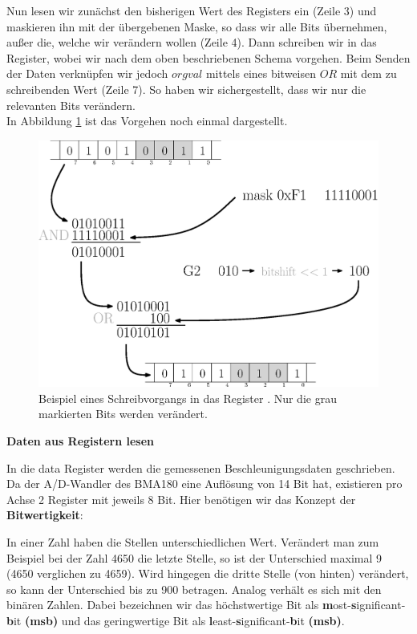 \documentclass[12pt,a4paper]{scrartcl}
\begin{document}
Nun lesen wir zunächst den bisherigen Wert des Registers ein (Zeile 3)  und maskieren ihn mit der übergebenen Maske, so dass wir alle Bits übernehmen, außer die, welche wir verändern wollen (Zeile 4). Dann schreiben wir in das Register, wobei wir nach dem oben beschriebenen Schema vorgehen. Beim Senden der Daten verknüpfen wir jedoch $orgval$ mittels eines bitweisen $OR$ mit dem zu schreibenden Wert (Zeile 7). So haben wir sichergestellt, dass wir nur die relevanten Bits verändern.\\
In Abbildung \ref{bitops} ist das Vorgehen noch einmal dargestellt.

\begin{figure}[H]
\centering
\includegraphics[scale=.5]{bitops.eps}
\caption{Beispiel eines Schreibvorgangs in das Register . Nur die grau markierten Bits werden verändert.}
\label{bitops}
\end{figure}

\textbf{Daten aus Registern lesen}

In die data Register werden die gemessenen Beschleunigungsdaten geschrieben. Da der A/D-Wandler des BMA180 eine Auflösung von 14 Bit hat, existieren pro Achse 2 Register mit jeweils 8 Bit. 
Hier benötigen wir das Konzept der \textbf{Bitwertigkeit}:

In einer Zahl haben die Stellen unterschiedlichen Wert. Verändert man zum Beispiel bei der Zahl 4650 die letzte Stelle, so ist der Unterschied maximal 9 (4650 verglichen zu 4659). Wird hingegen die dritte Stelle (von hinten) verändert, so kann der Unterschied bis zu 900 betragen. Analog verhält es sich mit den binären Zahlen. 
Dabei bezeichnen wir das höchstwertige Bit als \textbf{m}ost-\textbf{s}ignificant-\textbf{b}it \textbf{(msb)} und das geringwertige Bit als \textbf{l}east-\textbf{s}ignificant-\textbf{b}it \textbf{(msb)}.
\end{document}
